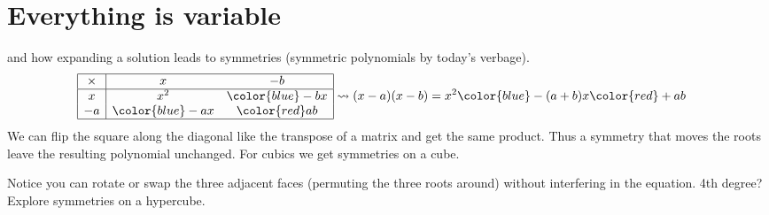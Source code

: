 \section{Everything is variable}


and how expanding a solution leads to symmetries (symmetric 
polynomials by today's verbage).
\begin{align*}
    \begin{array}{|c|cc|}
        \hline
        \times & x & -b \\
        \hline
        x & x^2 & {\color{blue} -bx}\\
        -a & {\color{blue} -ax} & {\color{red} ab} \\
    \hline
    \end{array}
    & \leadsto (x-a)(x-b)=x^2{\color{blue} -(a+b)x}{\color{red}+ab}
\end{align*}
We can flip the square along the diagonal like the transpose of a matrix 
and get the same product.  Thus a symmetry that moves the roots leave the 
resulting polynomial unchanged.  For cubics we get symmetries on a cube.
\begin{center}
\end{center}
Notice you can rotate or swap the three adjacent faces (permuting the three roots around) 
without interfering in the equation.  4th degree?  Explore symmetries on a hypercube.
